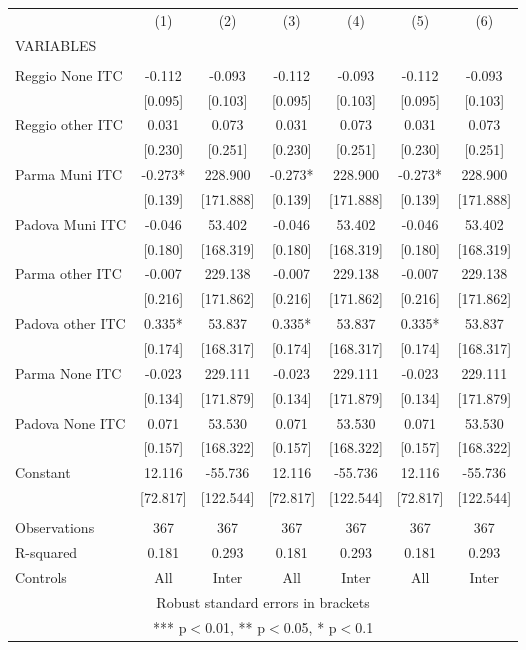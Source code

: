\begin{tabular}{lcccccc} \hline
 & (1) & (2) & (3) & (4) & (5) & (6) \\
VARIABLES &  &  &  &  &  &  \\ \hline
 &  &  &  &  &  &  \\
Reggio None ITC & -0.112 & -0.093 & -0.112 & -0.093 & -0.112 & -0.093 \\
 & [0.095] & [0.103] & [0.095] & [0.103] & [0.095] & [0.103] \\
Reggio other ITC & 0.031 & 0.073 & 0.031 & 0.073 & 0.031 & 0.073 \\
 & [0.230] & [0.251] & [0.230] & [0.251] & [0.230] & [0.251] \\
Parma Muni ITC & -0.273* & 228.900 & -0.273* & 228.900 & -0.273* & 228.900 \\
 & [0.139] & [171.888] & [0.139] & [171.888] & [0.139] & [171.888] \\
Padova Muni ITC & -0.046 & 53.402 & -0.046 & 53.402 & -0.046 & 53.402 \\
 & [0.180] & [168.319] & [0.180] & [168.319] & [0.180] & [168.319] \\
Parma other ITC & -0.007 & 229.138 & -0.007 & 229.138 & -0.007 & 229.138 \\
 & [0.216] & [171.862] & [0.216] & [171.862] & [0.216] & [171.862] \\
Padova other ITC & 0.335* & 53.837 & 0.335* & 53.837 & 0.335* & 53.837 \\
 & [0.174] & [168.317] & [0.174] & [168.317] & [0.174] & [168.317] \\
Parma None ITC & -0.023 & 229.111 & -0.023 & 229.111 & -0.023 & 229.111 \\
 & [0.134] & [171.879] & [0.134] & [171.879] & [0.134] & [171.879] \\
Padova None ITC & 0.071 & 53.530 & 0.071 & 53.530 & 0.071 & 53.530 \\
 & [0.157] & [168.322] & [0.157] & [168.322] & [0.157] & [168.322] \\
Constant & 12.116 & -55.736 & 12.116 & -55.736 & 12.116 & -55.736 \\
 & [72.817] & [122.544] & [72.817] & [122.544] & [72.817] & [122.544] \\
 &  &  &  &  &  &  \\
Observations & 367 & 367 & 367 & 367 & 367 & 367 \\
R-squared & 0.181 & 0.293 & 0.181 & 0.293 & 0.181 & 0.293 \\
 Controls & All & Inter & All & Inter & All & Inter \\ \hline
\multicolumn{7}{c}{ Robust standard errors in brackets} \\
\multicolumn{7}{c}{ *** p$<$0.01, ** p$<$0.05, * p$<$0.1} \\
\end{tabular}
